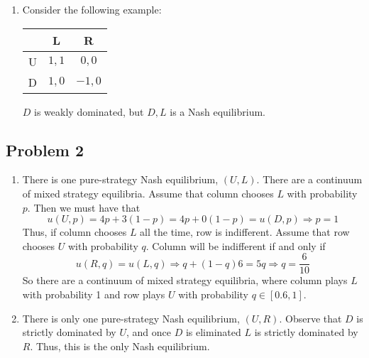 \documentclass[10pt]{article}
\begin{document}
\begin{enumerate}
	\item Consider the following example: \begin{center} \begin{tabular}{c|cc} & L & R \\\hline U & $1,1$ & $0,0$ \\D & $1,0$ & $-1,0$\end{tabular}\end{center}$D$ is weakly dominated, but $D,L$ is a Nash equilibrium.
\end{enumerate}

\subsection*{Problem 2}

\begin{enumerate}
	\item There is one pure-strategy Nash equilibrium, $(U,L)$. There are a continuum of mixed strategy equilibria. Assume that column chooses $L$ with probability $p$. Then we must have that \[u(U,p) = 4p + 3(1-p) = 4p + 0(1-p) = u(D,p) \Longrightarrow p = 1\]Thus, if column chooses $L$ all the time, row is indifferent. Assume that row chooses $U$ with probability $q$. Column will be indifferent if and only if \[u(R,q) = u(L,q) \Longrightarrow q + (1-q)6= 5q \Longrightarrow q =  \frac{6}{10}\]So there are a continuum of mixed strategy equilibria, where column plays $L$ with probability 1 and row plays $U$ with probability $q \in [0.6,1]$.
	\item There is only one pure-strategy Nash equilibrium, $(U,R)$. Observe that $D$ is strictly dominated by $U$, and once $D$ is eliminated $L$ is strictly dominated by $R$. Thus, this is the only Nash equilibrium.

\end{enumerate}
\end{document}
